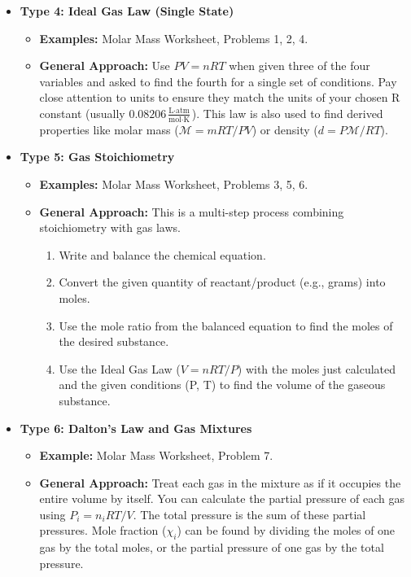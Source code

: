 \documentclass{article}
\begin{document}
\begin{itemize}
    \item \textbf{Type 4: Ideal Gas Law (Single State)}
        \begin{itemize}
            \item \textbf{Examples:} Molar Mass Worksheet, Problems 1, 2, 4.
            \item \textbf{General Approach:} Use $PV=nRT$ when given three of the four variables and asked to find the fourth for a single set of conditions. Pay close attention to units to ensure they match the units of your chosen R constant (usually $0.08206 \frac{\text{L} \cdot \text{atm}}{\text{mol} \cdot \text{K}}$). This law is also used to find derived properties like molar mass ($\mathcal{M} = mRT/PV$) or density ($d = P\mathcal{M}/RT$).
        \end{itemize}

    \item \textbf{Type 5: Gas Stoichiometry}
        \begin{itemize}
            \item \textbf{Examples:} Molar Mass Worksheet, Problems 3, 5, 6.
            \item \textbf{General Approach:} This is a multi-step process combining stoichiometry with gas laws.
                \begin{enumerate}
                    \item Write and balance the chemical equation.
                    \item Convert the given quantity of reactant/product (e.g., grams) into moles.
                    \item Use the mole ratio from the balanced equation to find the moles of the desired substance.
                    \item Use the Ideal Gas Law ($V=nRT/P$) with the moles just calculated and the given conditions (P, T) to find the volume of the gaseous substance.
                \end{enumerate}
        \end{itemize}

    \item \textbf{Type 6: Dalton's Law and Gas Mixtures}
        \begin{itemize}
            \item \textbf{Example:} Molar Mass Worksheet, Problem 7.
            \item \textbf{General Approach:} Treat each gas in the mixture as if it occupies the entire volume by itself. You can calculate the partial pressure of each gas using $P_i=n_iRT/V$. The total pressure is the sum of these partial pressures. Mole fraction ($\chi_i$) can be found by dividing the moles of one gas by the total moles, or the partial pressure of one gas by the total pressure.
        \end{itemize}


\end{itemize}
\end{document}
